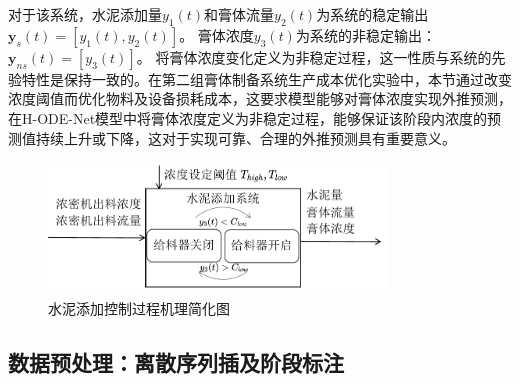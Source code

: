对于该系统，水泥添加量$y_1(t)$和膏体流量$y_2(t)$为系统的稳定输出$\boldsymbol y_s(t)=[y_1(t), y_2(t)]$。
膏体浓度$y_3(t)$为系统的非稳定输出：$\boldsymbol y_{ns}(t)=[y_3(t)]$。
将膏体浓度变化定义为非稳定过程，这一性质与系统的先验特性是保持一致的。在第二组膏体制备系统生产成本优化实验中，本节通过改变浓度阈值而优化物料及设备损耗成本，这要求模型能够对膏体浓度实现外推预测，在H-ODE-Net模型中将膏体浓度定义为非稳定过程，能够保证该阶段内浓度的预测值持续上升或下降，这对于实现可靠、合理的外推预测具有重要意义。
\begin{figure}[h]
    \centering
    \includegraphics[width=0.8\textwidth]{figures/chapter4/add_cement_workloop.pdf}
  \caption{水泥添加控制过程机理简化图}
  \label{fig:add_cement_workloop} 
\end{figure}


\subsection{数据预处理：离散序列插及阶段标注}

